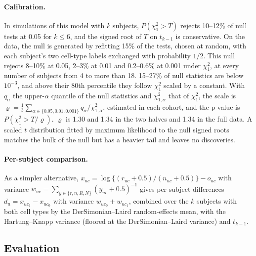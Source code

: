 \documentclass[11pt]{article}
\begin{document}
\paragraph{Calibration.} In simulations of this model with $k$ subjects, $P(\chi^2_1>T)$ rejects 10--12\% of null tests at 0.05 for $k\le6$, and the signed root of $T$ on $t_{k-1}$ is conservative. On the data, the null is generated by refitting 15\% of the tests, chosen at random, with each subject's two cell-type labels exchanged with probability $1/2$. This null rejects 8--10\% at 0.05, 2--3\% at 0.01 and 0.2--0.6\% at 0.001 under $\chi^2_1$, at every number of subjects from 4 to more than 18. 15--27\% of null statistics are below $10^{-3}$, and above their 80th percentile they follow $\chi^2_1$ scaled by a constant. With $q_\alpha$ the upper-$\alpha$ quantile of the null statistics and $\chi^2_{1,\alpha}$ that of $\chi^2_1$, the scale is $\varrho=\frac13\sum_{\alpha\in\{0.05,0.01,0.001\}}q_\alpha/\chi^2_{1,\alpha}$, estimated in each cohort, and the p-value is $P(\chi^2_1>T/\varrho)$. $\varrho$ is 1.30 and 1.34 in the two halves and 1.34 in the full data. A scaled $t$ distribution fitted by maximum likelihood to the null signed roots matches the bulk of the null but has a heavier tail and leaves no discoveries.

\paragraph{Per-subject comparison.} As a simpler alternative, $x_{uc}=\log\{(r_{uc}+0.5)/(n_{uc}+0.5)\}-o_{uc}$ with variance $w_{uc}=\sum_{y\in\{r,n,R,N\}}(y_{uc}+0.5)^{-1}$ gives per-subject differences $d_u=x_{uc_1}-x_{uc_0}$ with variance $w_{uc_0}+w_{uc_1}$, combined over the $k$ subjects with both cell types by the DerSimonian--Laird random-effects mean, with the Hartung--Knapp variance (floored at the DerSimonian--Laird variance) and $t_{k-1}$.

\subsection{Evaluation}
\end{document}
